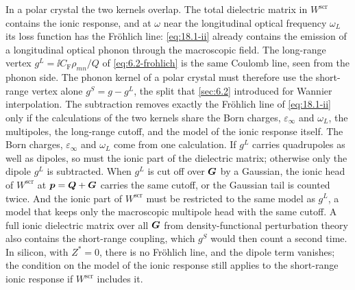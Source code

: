 In a polar crystal the two kernels overlap. The total dielectric matrix in $W^{\mathrm{scr}}$ contains the ionic response, and at $\omega$ near the longitudinal optical frequency $\omega_L$ its loss function has the Fr\"ohlich line: \cref{eq:18.1-ii} already contains the emission of a longitudinal optical phonon through the macroscopic field. The long-range vertex $g^L = \ii C_{\mathrm{F}}\rho_{mn}/Q$ of \cref{eq:6.2-frohlich} is the same Coulomb line, seen from the phonon side. The phonon kernel of a polar crystal must therefore use the short-range vertex alone $g^S = g - g^L$, the split that \cref{sec:6.2} introduced for Wannier interpolation. The subtraction removes exactly the Fr\"ohlich line of \cref{eq:18.1-ii} only if the calculations of the two kernels share the Born charges, $\varepsilon_\infty$ and $\omega_L$, the multipoles, the long-range cutoff, and the model of the ionic response itself. The Born charges, $\varepsilon_\infty$ and $\omega_L$ come from one calculation. If $g^L$ carries quadrupoles as well as dipoles, so must the ionic part of the dielectric matrix; otherwise only the dipole $g^L$ is subtracted. When $g^L$ is cut off over $\bm{G}$ by a Gaussian, the ionic head of $W^{\mathrm{scr}}$ at $\bm{p} = \bm{Q} + \bm{G}$ carries the same cutoff, or the Gaussian tail is counted twice. And the ionic part of $W^{\mathrm{scr}}$ must be restricted to the same model as $g^L$, a model that keeps only the macroscopic multipole head with the same cutoff. A full ionic dielectric matrix over all $\bm{G}$ from density-functional perturbation theory also contains the short-range coupling, which $g^S$ would then count a second time. In silicon, with $Z^* = 0$, there is no Fr\"ohlich line, and the dipole term vanishes; the condition on the model of the ionic response still applies to the short-range ionic response if $W^{\mathrm{scr}}$ includes it.

